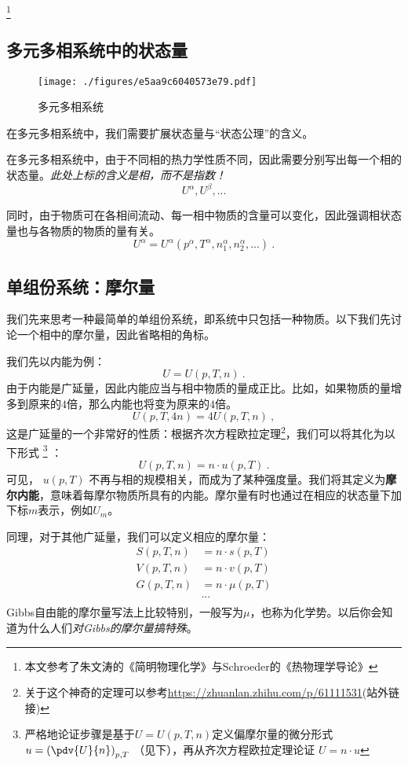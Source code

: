 
\begin{issues}
\issueDraft
\end{issues}

\footnote{本文参考了朱文涛的《简明物理化学》与Schroeder的《热物理学导论》}

\subsection{多元多相系统中的状态量}
\begin{figure}[ht]
\centering
\texttt{[image: ./figures/e5aa9c6040573e79.pdf]}
\caption{多元多相系统} \label{fig_ParMol_1}
\end{figure}

在多元多相系统中，我们需要扩展状态量与“状态公理”的含义。

在多元多相系统中，由于不同相的热力学性质不同，因此需要分别写出每一个相的状态量。\textsl{此处上标的含义是相，而不是指数！}
$$U^\alpha, U^\beta,...$$

同时，由于物质可在各相间流动、每一相中物质的含量可以变化，因此强调相状态量也与各物质的物质的量有关。
$$U^\alpha = U^\alpha (p^\alpha, T^\alpha, n_1^\alpha,n_2^\alpha,...)~.$$

\subsection{单组份系统：摩尔量}
我们先来思考一种最简单的单组份系统，即系统中只包括一种物质。以下我们先讨论一个相中的摩尔量，因此省略相的角标。

我们先以内能为例：
$$U = U (p, T, n)~.$$
由于内能是广延量，因此内能应当与相中物质的量成正比。比如，如果物质的量增多到原来的$4$倍，那么内能也将变为原来的$4$倍。
$$U(p, T, 4 n) = 4 U (p, T, n)~,$$
这是广延量的一个非常好的性质：根据齐次方程欧拉定理\footnote{关于这个神奇的定理可以参考\href{https://zhuanlan.zhihu.com/p/61111531}{https://zhuanlan.zhihu.com/p/61111531}(站外链接)}，我们可以将其化为以下形式
\footnote{严格地论证步骤是基于$U=U(p,T,n)$定义偏摩尔量的微分形式$u = \left( \pdv{U}{n} \right)_{p,T}$ （见下），再从齐次方程欧拉定理论证 $U = n \cdot u $}
：
$$U(p, T, n) = n \cdot u (p, T)~.$$
可见， $u (p, T)$ 不再与相的规模相关，而成为了某种强度量。我们将其定义为\textbf{摩尔内能}，意味着每摩尔物质所具有的内能。摩尔量有时也通过在相应的状态量下加下标$m$表示，例如$U_m$。

同理，对于其他广延量，我们可以定义相应的摩尔量：
$$
\begin{aligned}
S(p, T, n) &= n \cdot s (p, T)\\
V(p, T, n) &= n \cdot v (p, T)\\
G(p, T, n) &= n \cdot \mu (p, T)\\
&...\\
\end{aligned}
$$
Gibbs自由能的摩尔量写法上比较特别，一般写为$\mu$，也称为化学势。以后你会知道为什么人们\textsl{对Gibbs的摩尔量搞特殊}。

